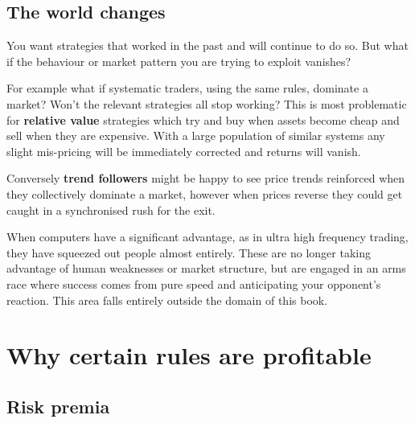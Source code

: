 \subsection*{The world changes}

You want strategies that worked in the past and will continue to do so. But what if the behaviour or market pattern you are trying to exploit vanishes?

For example what if systematic traders, using the same rules, dominate a market? Won't the relevant strategies all stop working? This is most problematic for \textbf{relative value} strategies which try and buy when assets become cheap and sell when they are expensive. With a large population of similar systems any slight mis-pricing will be immediately corrected and returns will vanish.

Conversely \textbf{trend followers} might be happy to see price trends reinforced when they collectively dominate a market, however when prices reverse they could get caught in a synchronised rush for the exit.

When computers have a significant advantage, as in ultra high frequency trading, they have squeezed out people almost entirely. These are no longer taking advantage of human weaknesses or market structure, but are engaged in an arms race where success comes from pure speed and anticipating your opponent's reaction. This area falls entirely outside the domain of this book.

\section*{Why certain rules are profitable}  {}

%

\subsection*{Risk premia}

